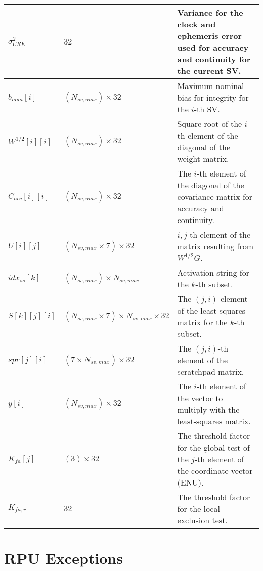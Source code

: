\documentclass[11pt]{article}
\begin{document}
\begin{table}[htbp]
\begin{center}
\begin{tabular}{|m{1.5cm}|m{2.5cm}|m{7cm}|}
    $\sigma_{URE}^2$ & $32$ & Variance for the clock and ephemeris error used for accuracy and continuity for the current SV.\\ \hline

    $b_{nom}[i]$ & $(N_{sv,max}) \times 32$ & Maximum nominal bias for integrity for the $i$-th SV.\\ \hline

    $W^{1/2}[i][i]$ & $(N_{sv,max}) \times 32$ & Square root of the $i$-th element of the diagonal of the weight matrix.\\ \hline

    $C_{acc}[i][i]$ & $(N_{sv,max}) \times 32$ & The $i$-th element of the diagonal of the covariance matrix for accuracy and continuity.\\ \hline

    $U[i][j]$ & $(N_{sv,max} \times 7) \times 32$ & $i,j$-th element of the matrix resulting from $W^{1/2}G$.\\ \hline

    $idx_{ss}[k]$ & $(N_{ss,max}) \times N_{sv,max}$ & Activation string for the $k$-th subset.\\ \hline

    $S[k][j][i]$ & $(N_{ss,max} \times 7) \times N_{sv,max} \times 32$ & The $(j,i)$ element of the least-squares matrix for the $k$-th subset.\\ \hline

    $spr[j][i]$ & $(7 \times N_{sv,max}) \times 32$ & The $(j,i)$-th element of the scratchpad matrix.\\ \hline

    $y[i]$ & $(N_{sv,max}) \times 32$ & The $i$-th element of the vector to multiply with the least-squares matrix.\\ \hline

    $K_{fa}[j]$ & $(3) \times 32$ & The threshold factor for the global test of the $j$-th element of the coordinate vector (ENU).\\ \hline

    $K_{fa,r}$ & $32$ & The threshold factor for the local exclusion test.\\ \hline
  \end{tabular}
\end{center}
\end{table}

\section{RPU Exceptions}
\end{document}
